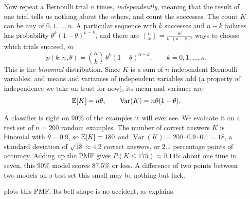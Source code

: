 Now repeat a Bernoulli trial $n$ times, \emph{independently}, meaning
that the result of one trial tells us nothing about the others, and
count the successes. The count $K$ can be any of $0, 1, \dots, n$. A
particular sequence with $k$ successes and $n - k$ failures has
probability $\theta^k (1 - \theta)^{n - k}$, and there are
$\binom{n}{k} = \frac{n!}{k!\,(n-k)!}$ ways to choose which trials
succeed, so
\[
  p(k; n, \theta) = \binom{n}{k}\, \theta^k (1 - \theta)^{n - k},
  \qquad k = 0, 1, \dots, n .
\]
This is the \emph{binomial} distribution. Since $K$ is a sum of $n$
independent Bernoulli variables, and means and variances of independent
variables add (a property of independence we take on trust for now),
its mean and
variance are
\[
  \mathbb{E}[K] = n\theta,
  \qquad
  \operatorname{Var}(K) = n\theta(1 - \theta) .
\]

\begin{example}
  \label{ex:ch05-test-accuracy}
  A classifier is right on $90\%$ of the examples it will ever see. We
  evaluate it on a test set of $n = 200$ random examples. The number of
  correct answers $K$ is binomial with $\theta = 0.9$, so $\mathbb{E}[K] = 180$
  and $\operatorname{Var}(K) = 200 \cdot 0.9 \cdot 0.1 = 18$, a standard
  deviation of $\sqrt{18} \approx 4.2$ correct answers, or $2.1$
  percentage points of accuracy. Adding up the PMF gives $P(K \le 175)
  \approx 0.145$: about one time in seven, this $90\%$ model scores
  $87.5\%$ or less. A difference of two points between two models on a
  test set this small may be nothing but luck.
\end{example}

 plots this PMF. Its bell shape is no accident,
as  explains.

